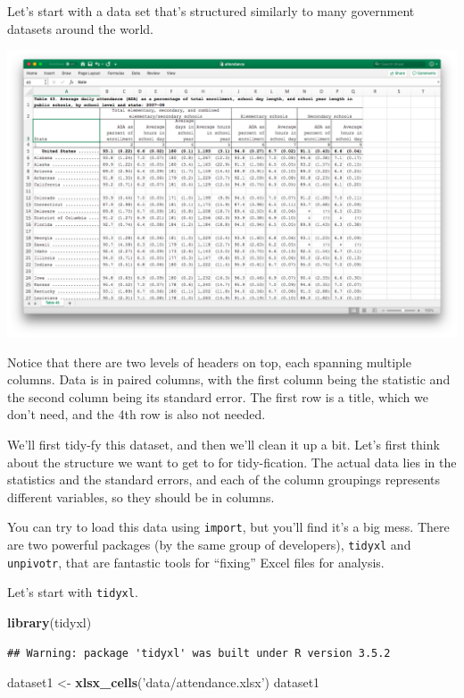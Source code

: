 \documentclass[12pt,letterpaperpaper,openany]{book}
\newenvironment{Shaded}{\begin{snugshade}}{\end{snugshade}}
\newcommand{\KeywordTok}[1]{\textcolor[rgb]{0.13,0.29,0.53}{\textbf{#1}}}
\newcommand{\NormalTok}[1]{#1}
\newcommand{\StringTok}[1]{\textcolor[rgb]{0.31,0.60,0.02}{#1}}
\begin{document}
Let's start with a data set that's structured similarly to many government datasets around
the world.

\includegraphics{img/ExcelClean.png}

Notice that there are two levels of headers on top, each spanning multiple columns.
Data is in paired columns, with the first column being the statistic and the second column
being its standard error. The first row is a title, which we don't need, and the
4th row is also not needed.

We'll first tidy-fy this dataset, and then we'll clean it up a bit. Let's first
think about the structure we want to get to for tidy-fication. The actual data lies in
the statistics and the standard errors, and each of the column groupings represents different
variables, so they should be in columns.

You can try to load this data using \texttt{import}, but you'll find it's a big mess.
There are two powerful packages (by the same group of developers), \texttt{tidyxl} and
\texttt{unpivotr}, that are fantastic tools for ``fixing'' Excel files for analysis.

Let's start with \texttt{tidyxl}.

\begin{Shaded}
\begin{Highlighting}[]
\KeywordTok{library}\NormalTok{(tidyxl)}
\end{Highlighting}
\end{Shaded}

\begin{verbatim}
## Warning: package 'tidyxl' was built under R version 3.5.2
\end{verbatim}

\begin{Shaded}
\begin{Highlighting}[]
\NormalTok{dataset1 <-}\StringTok{ }\KeywordTok{xlsx_cells}\NormalTok{(}\StringTok{'data/attendance.xlsx'}\NormalTok{)}
\NormalTok{dataset1}
\end{Highlighting}
\end{Shaded}
\end{document}
